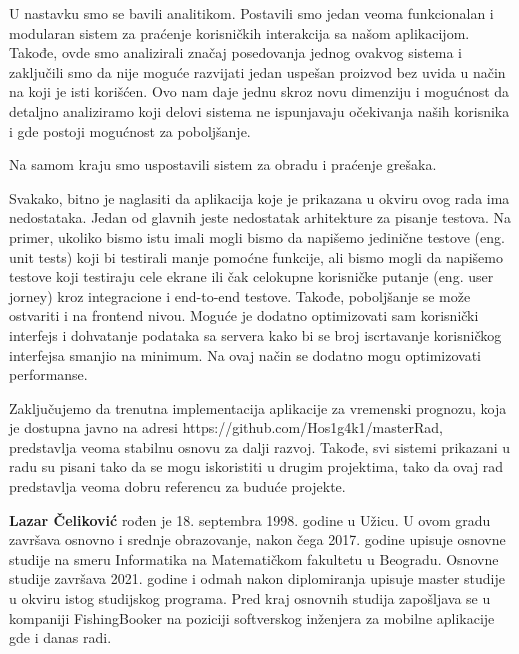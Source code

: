 \documentclass[12pt,oneside]{memoir}
\begin{document}
U nastavku smo se bavili analitikom. Postavili smo jedan veoma funkcionalan i modularan sistem za praćenje korisničkih interakcija sa našom aplikacijom. Takođe, ovde smo analizirali značaj posedovanja jednog ovakvog sistema i zaključili smo da nije moguće razvijati jedan uspešan proizvod bez uvida u način na koji je isti korišćen. Ovo nam daje jednu skroz novu dimenziju i mogućnost da detaljno analiziramo koji delovi sistema ne ispunjavaju očekivanja naših korisnika i gde postoji mogućnost za poboljšanje.

Na samom kraju smo uspostavili sistem za obradu i praćenje grešaka.

Svakako, bitno je naglasiti da aplikacija koje je prikazana u okviru ovog rada ima nedostataka. Jedan od glavnih jeste nedostatak arhitekture za pisanje testova. Na primer, ukoliko bismo istu imali mogli bismo da napišemo jedinične testove (eng. unit tests) koji bi testirali manje pomoćne funkcije, ali bismo mogli da napišemo testove koji testiraju cele ekrane ili čak celokupne korisničke putanje (eng. user jorney) kroz integracione i end-to-end testove. Takođe, poboljšanje se može ostvariti i na frontend nivou. Moguće je dodatno optimizovati sam korisnički interfejs i dohvatanje podataka sa servera kako bi se broj iscrtavanje korisničkog interfejsa smanjio na minimum. Na ovaj način se dodatno mogu optimizovati performanse.

Zaključujemo da trenutna implementacija aplikacije za vremenski prognozu, koja je dostupna javno na adresi https://github.com/Hos1g4k1/masterRad, predstavlja veoma stabilnu osnovu za dalji razvoj. Takođe, svi sistemi prikazani u radu su pisani tako da se mogu iskoristiti u drugim projektima, tako da ovaj rad predstavlja veoma dobru referencu za buduće projekte.


\literatura

\backmatter

\begin{biografija}
  \textbf{Lazar Čeliković} rođen je 18. septembra 1998. godine u Užicu. U ovom gradu završava osnovno i srednje obrazovanje, nakon čega 2017. godine upisuje osnovne studije na smeru Informatika na Matematičkom fakultetu u Beogradu. Osnovne studije završava 2021. godine i odmah nakon diplomiranja upisuje master studije u okviru istog studijskog programa. Pred kraj osnovnih studija zapošljava se u kompaniji FishingBooker na poziciji softverskog inženjera za mobilne aplikacije gde i danas radi.
\end{biografija}
\end{document}

